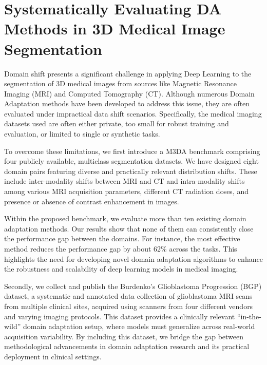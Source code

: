 

\chapter{Systematically Evaluating DA Methods in 3D Medical Image Segmentation}
\label{chap:da_bench}


Domain shift presents a significant challenge in applying Deep Learning to the segmentation of 3D medical images from sources like Magnetic Resonance Imaging (MRI) and Computed Tomography (CT). Although numerous Domain Adaptation methods have been developed to address this issue, they are often evaluated under impractical data shift scenarios. Specifically, the medical imaging datasets used are often either private, too small for robust training and evaluation, or limited to single or synthetic tasks.

To overcome these limitations, we first introduce a M3DA benchmark comprising four publicly available, multiclass segmentation datasets. We have designed eight domain pairs featuring diverse and practically relevant distribution shifts. These include inter-modality shifts between MRI and CT and intra-modality shifts among various MRI acquisition parameters, different CT radiation doses, and presence or absence of contrast enhancement in images.

Within the proposed benchmark, we evaluate more than ten existing domain adaptation methods. Our results show that none of them can consistently close the performance gap between the domains. For instance, the most effective method reduces the performance gap by about 62\% across the tasks. This highlights the need for developing novel domain adaptation algorithms to enhance the robustness and scalability of deep learning models in medical imaging.

Secondly, we collect and publish the Burdenko's Glioblastoma Progression (BGP) dataset, a systematic and annotated data collection of glioblastoma MRI scans from multiple clinical sites, acquired using scanners from four different vendors and varying imaging protocols. This dataset provides a clinically relevant ``in-the-wild'' domain adaptation setup, where models must generalize across real-world acquisition variability. By including this dataset, we bridge the gap between methodological advancements in domain adaptation research and its practical deployment in clinical settings.


